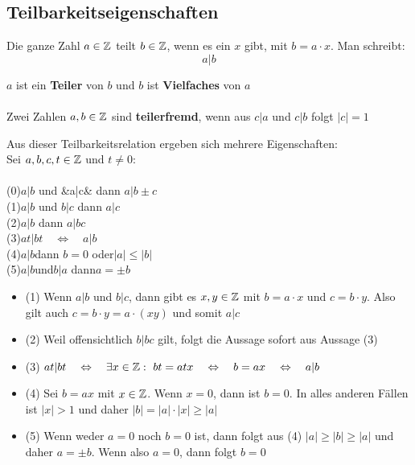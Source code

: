 	\subsection{Teilbarkeitseigenschaften}

\begin{Definition}
Die ganze Zahl $a\in\mathbb{Z}$ teilt $b\in\mathbb{Z}$, wenn es ein $x$ gibt, mit $b=a\cdot x$. Man schreibt:
$$a|b$$

$a$ ist ein \textbf{Teiler} von $b$ und $b$ ist \textbf{Vielfaches} von $a$\\\\

Zwei Zahlen $a,b\in\mathbb{Z}$  sind \textbf{teilerfremd}, wenn aus $ c | a  $ und $c|b$ folgt $|c|=1$
\end{Definition}

\begin{Theorem}
Aus dieser Teilbarkeitsrelation ergeben sich mehrere Eigenschaften:\\
Sei $a,b,c,t\in\mathbb{Z}$ und $t\neq0$:\\\\
(0)\qquad$a|b$ \quad und \quad&a|c& \quad dann \quad $a|b\pm c $\\ 
(1)\qquad$a|b$ \quad und \quad$b|c$ \quad dann \quad $a|c$\\
(2)\qquad$a|b$ \quad dann \quad $a|bc$\\
(3)\qquad$at|bt\quad\Leftrightarrow\quad a|b$\\
(4)\qquad$a|b$\quad dann \quad $b=0$ \quad oder\quad $|a| \leq |b| $\\
(5)\qquad$a|b$\quad und\quad $b|a$ \quad dann\quad $a=\pm b$
\end{Theorem}

\begin{Beweis}
\begin{itemize}
\item (1) \quad Wenn $a|b$ und $b|c$, dann gibt es $x,y\in\mathbb{Z}$ mit $b=a\cdot x$ und $c=b\cdot y$. Also gilt auch $c=b\cdot y=a\cdot(xy)$ und somit $a|c$\\ 
\item (2) \quad Weil offensichtlich $b|bc$ gilt, folgt die Aussage sofort aus Aussage (3) \\
\item (3)  \quad $at|bt\quad \Leftrightarrow\quad \exists x \in \mathbb{Z} : \, \, bt=atx \quad\Leftrightarrow \quad b=ax \quad\Leftrightarrow \quad a|b$ \\
\item (4) \quad Sei $b=ax$ mit $x\in\mathbb{Z}$. Wenn $x=0$, dann ist $b=0$. In alles anderen Fällen ist $|x|>1$ und daher $|b| = |a| \cdot |x| \geq |a|$ 
\item (5) \quad Wenn weder $a=0$ noch $b=0$ ist, dann folgt aus (4) $|a|\geq|b|\geq|a|$ und daher $a=\pm b$. Wenn also  $a=0$, dann folgt $b=0$
\end{itemize}
\end{Beweis}

